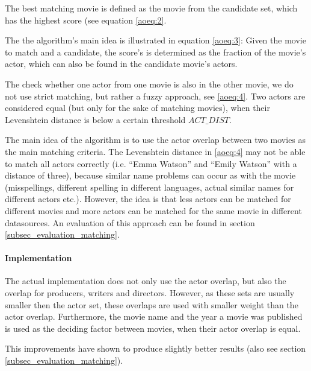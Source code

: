 The best matching movie is defined as the movie from the candidate set, which has the highest score (see equation \ref{aoeq:2}.

The the algorithm's main idea is illustrated in equation \ref{aoeq:3}: Given the movie to match and a candidate, the score's is determined as the fraction of the movie's actor, which can also be found in the candidate movie's actors.

The check whether one actor from one movie is also in the other movie, we do not use strict matching, but rather a fuzzy approach, see \ref{aoeq:4}.
Two actors are considered equal (but only for the sake of matching movies), when their Levenshtein distance is below a certain threshold $ACT\_DIST$.

The main idea of the algorithm is to use the actor overlap between two movies as the main matching criteria.
The Levenshtein distance in \ref{aoeq:4} may not be able to match all actors correctly (i.e. "`Emma Watson"' and "`Emily Watson"' with a distance of three), because similar name problems can occur as with the movie (misspellings, different spelling in different languages, actual similar names for different actors etc.).
However, the idea is that less actors can be matched for different movies and more actors can be matched for the same movie in different datasources.
An evaluation of this approach can be found in section \ref{subsec_evaluation_matching}.

\paragraph{Implementation}
The actual implementation does not only use the actor overlap, but also the overlap for producers, writers and directors.
However, as these sets are usually smaller then the actor set, these overlaps are used with smaller weight than the actor overlap.
Furthermore, the movie name and the year a movie was published is used as the deciding factor between movies, when their actor overlap is equal.

This improvements have shown to produce slightly better results (also see section \ref{subsec_evaluation_matching}).
